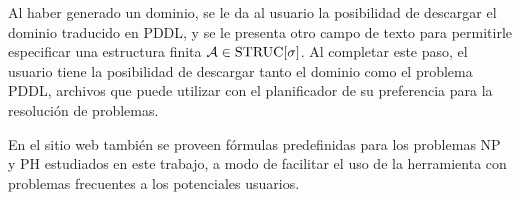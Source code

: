 Al haber generado un dominio, se le da al usuario la posibilidad de descargar
el dominio traducido en PDDL, y se le presenta otro campo de texto para
permitirle especificar una estructura finita $\mathcal{A} \in \text{STRUC}[\sigma]$.
Al completar este paso, el usuario tiene la posibilidad de descargar tanto el
dominio como el problema PDDL, archivos que puede utilizar con el planificador
de su preferencia para la resolución de problemas.

En el sitio web también se proveen fórmulas predefinidas para los problemas NP
y PH estudiados en este trabajo, a modo de facilitar el uso de la herramienta
con problemas frecuentes a los potenciales usuarios.
